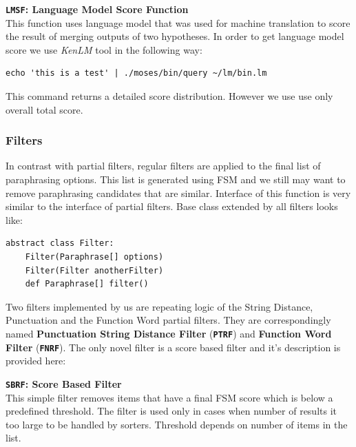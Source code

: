 \begin{flushleft}
\textbf{\texttt{LMSF}: \textbf{Language Model Score Function}} \\
This function uses language model that was used for machine translation to score the result of merging outputs of two hypotheses. In order to get language model score we use \emph{KenLM} tool in the following way:

\begin{verbatim}
echo 'this is a test' | ./moses/bin/query ~/lm/bin.lm
\end{verbatim}

This command returns a detailed score distribution. However we use use only overall total score.
\bigskip

\end{flushleft}


\subsubsection{Filters}

In contrast with partial filters, regular filters are applied to the final list of paraphrasing options. This list is generated using FSM and we still may want to remove paraphrasing candidates that are similar. Interface of this function is very similar to the interface of partial filters. Base class extended by all filters looks like:

\begin{verbatim}
abstract class Filter:
    Filter(Paraphrase[] options)
    Filter(Filter anotherFilter)
    def Paraphrase[] filter()
\end{verbatim}

Two filters implemented by us are repeating logic of the String Distance, Punctuation and the Function Word partial filters. They are correspondingly named \textbf{Punctuation String Distance Filter} (\textbf{\texttt{PTRF}}) and \textbf{Function Word Filter} (\texttt{\textbf{FNRF}}). The only novel filter is a score based filter and it's description is provided here:


\begin{flushleft}

\textbf{\texttt{SBRF}: \textbf{Score Based Filter}} \\
This simple filter removes items that have a final FSM score which is below a predefined threshold. 
The filter is used only in cases when number of results it too large to be handled by sorters. Threshold depends on number of items in the list.
\bigskip

\end{flushleft}

